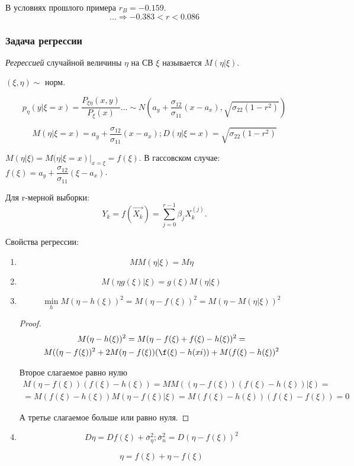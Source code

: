 \begin{ex}
  В условиях прошлого примера $r_B = -0.159$.
  \[
    \dots \Rightarrow -0.383 < r < 0.086
  \]
\end{ex}

\subsubsection{Задача регрессии}

\begin{definition}
  \emph{Регрессией} случайной величины $\eta$ на СВ $\xi$ называется $M(\eta | \xi)$.   
\end{definition}

\begin{ex}
  $(\xi, \eta) \sim$ норм.

  \[
    p_\eta (y | \xi=x) = \dfrac{P_{\xi\eta} (x, y)}{P_\xi(x)} \dots \sim N\left(a_y+\dfrac{\sigma_{12}}{\sigma_{11}}(x-a_x), \sqrt{\sigma_{22} (1-r^2)}\right)
  \]

  \[
    M(\eta | \xi=x) = a_y + \dfrac{\sigma_{12}}{\sigma_{11}} (x-a_x);
    D(\eta | \xi=x) = \sqrt{\sigma_{22} (1-r^2) }
  \]

  $M(\eta | \xi) = M(\eta | \xi=x) |_{x=\xi} = f(\xi)$.
  В гассовском случае:
  $f(\xi) = a_y + \dfrac{\sigma_{12}}{\sigma_{11}} (\xi - a_x)$.

  Для r-мерной выборки:
  \[
    Y_k = f(\vec{X_k}) = \sum_{j=0}^{r-1} \beta_j X_k^{(j)}.
  \]
\end{ex}

Свойства регрессии:
\begin{enumerate}
  \item
    \[
      M M(\eta | \xi) = M \eta
    \]
  \item
    \[
      M (\eta g(\xi) | \xi) = g(\xi) M(\eta | \xi)
    \]
  \item
    \[
      \min_{h} M(\eta - h(\xi))^2 = M (\eta - f(\xi))^2 = M (\eta - M(\eta | \xi))^2
    \]
    \begin{proof}
      \begin{multline*}
        M(\eta - h(\xi))^2 = M( \eta - f(\xi) + f(\xi) - h(\xi) )^2 = \\
        M( (\eta - f(\xi))^2 + 2 M(\eta - f(\xi))(\f(\xi) - h(xi)) + M (f(\xi) - h(\xi))^2 
      \end{multline*}

      Второе слагаемое равно нулю
      \begin{multline*}
        M(\eta - f(\xi))(f(\xi) - h(\xi)) = M M( (\eta - f(\xi))(f(\xi) - h(\xi)) |\xi ) = \\
        = M( f(\xi) - h(\xi) ) M(\eta - f(\xi) | \xi) 
        = M( f(\xi) - h(\xi) ) (f(\xi) - f(\xi)) = 0
      \end{multline*}

      А третье слагаемое больше или равно нуля.
    \end{proof}

  \item
    \[
      D \eta = D f(\xi) + \bar \sigma_\eta^2; \bar \sigma_n^2 = D(\eta - f(\xi))^2
    \]

    \[
      \eta = f(\xi) + \eta - f(\xi)
    \]
\end{enumerate}
